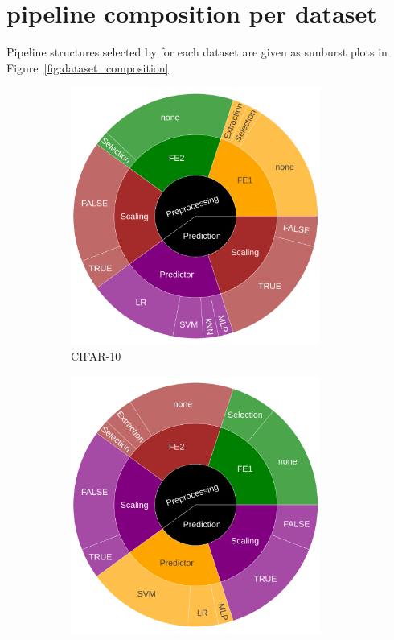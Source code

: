 \section{\isklearn pipeline composition per dataset}

Pipeline structures selected by \irace for each dataset are given as sunburst plots in Figure~\ref{fig:dataset_composition}.

\begin{figure}
    \centering
    
  	\begin{subfigure}[t]{0.3\textwidth}
    \centering\includegraphics[width=0.9\textwidth]{img/sunburst/cifar10.png}
    \caption{CIFAR-10}
  	\end{subfigure}
  	\begin{subfigure}[t]{0.3\textwidth}
    \centering\includegraphics[width=0.9\textwidth]{img/sunburst/fmnist.png}

\end{subfigure}
\end{figure}
